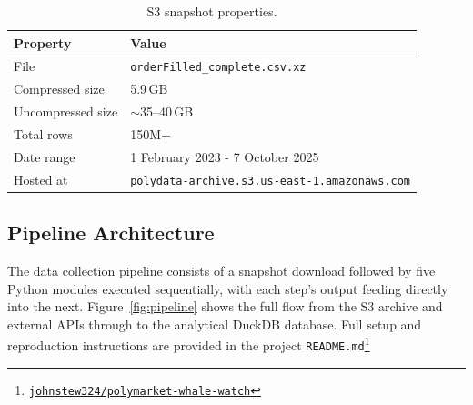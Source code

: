 \documentclass[11pt]{article}
\begin{document}
\vspace{0.6em}
\begin{table}[H]
\centering
\caption{S3 snapshot properties.}
\label{tab:s3_snapshot}
\small
\begin{tabularx}{\textwidth}{l X}
\toprule
\textbf{Property} & \textbf{Value} \\
\midrule
File                & \texttt{orderFilled\_complete.csv.xz} \\
Compressed size     & 5.9\,GB \\
Uncompressed size   & $\sim$35--40\,GB \\
Total rows          & 150M$+$ \\
Date range          & 1 February 2023 - 7 October 2025 \\
Hosted at           & \texttt{polydata-archive.s3.us-east-1.amazonaws.com} \\
\bottomrule
\end{tabularx}
\end{table}

\subsection{Pipeline Architecture}
\label{sec:pipeline}

The data collection pipeline consists of a snapshot download followed
by five Python modules executed sequentially, with each step's output
feeding directly into the next.
Figure~\ref{fig:pipeline} shows the full flow from the S3 archive and
external APIs through to the analytical DuckDB database.
Full setup and reproduction instructions are provided in the project
\texttt{README.md}\footnote{\href{https://github.com/johnstew324/polymarket-whale-watch}{%
\faGithub\;\texttt{johnstew324/polymarket-whale-watch}}}
\end{document}
